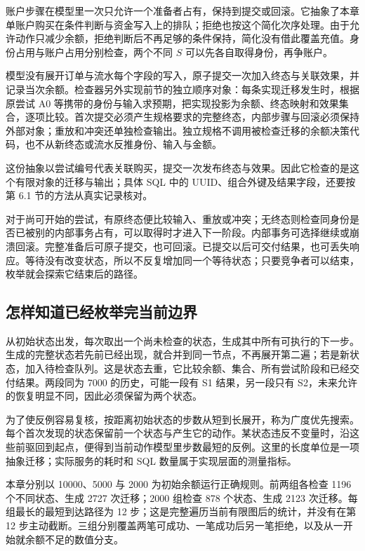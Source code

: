 账户步骤在模型里一次只允许一个准备者占有，保持到提交或回滚。它抽象了本章单账户购买在条件判断与资金写入上的排队；拒绝也按这个简化次序处理。由于允许动作只减少余额，拒绝判断后不再足够的条件保持，简化没有借此覆盖充值。身份占用与账户占用分别检查，两个不同 \(S\) 可以先各自取得身份，再争账户。

模型没有展开订单与流水每个字段的写入，原子提交一次加入终态与关联效果，并记录当次余额。检查器另外实现前节的独立顺序对象：每条实现迁移发生时，根据原尝试 A0 等携带的身份与输入求预期，把实现投影为余额、终态映射和效果集合，逐项比较。首次提交必须产生规格要求的完整终态，内部步骤与回滚必须保持外部对象；重放和冲突还单独检查输出。独立规格不调用被检查迁移的余额决策代码，也不从新终态或流水反推身份、输入与金额。

这份抽象以尝试编号代表关联购买，提交一次发布终态与效果。因此它检查的是这个有限对象的迁移与输出；具体 SQL 中的 UUID、组合外键及结果字段，还要按第 6.1 节的方法从真实记录核对。

对于尚可开始的尝试，有原终态便比较输入、重放或冲突；无终态则检查同身份是否已被别的内部事务占有，可以取得时才进入下一阶段。内部事务可选择继续或崩溃回滚。完整准备后可原子提交，也可回滚。已提交以后可交付结果，也可丢失响应。等待没有改变状态，所以不反复增加同一个等待状态；只要竞争者可以结束，枚举就会探索它结束后的路径。

\subsection*{怎样知道已经枚举完当前边界}

从初始状态出发，每次取出一个尚未检查的状态，生成其中所有可执行的下一步。生成的完整状态若先前已经出现，就合并到同一节点，不再展开第二遍；若是新状态，加入待检查队列。这是状态去重，它比较余额、集合、所有尝试阶段和已经交付结果。两段同为 7000 的历史，可能一段有 S1 结果，另一段只有 S2，未来允许的恢复明显不同，因此必须保留为两个状态。



为了使反例容易复核，按距离初始状态的步数从短到长展开，称为广度优先搜索。每个首次发现的状态保留前一个状态与产生它的动作。某状态违反不变量时，沿这些前驱回到起点，便得到当前动作模型里步数最短的反例。这里的长度单位是一项抽象迁移；实际服务的耗时和 SQL 数量属于实现层面的测量指标。



本章分别以 10000、5000 与 2000 为初始余额运行正确规则。前两组各检查 1196 个不同状态、生成 2727 次迁移；2000 组检查 878 个状态、生成 2123 次迁移。每组最长的最短到达路径为 12 步；这是完整遍历当前有限图后的统计，并没有在第 12 步主动截断。三组分别覆盖两笔可成功、一笔成功后另一笔拒绝，以及从一开始就余额不足的数值分支。

